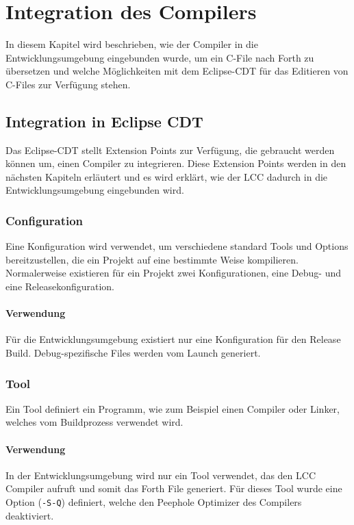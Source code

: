\chapter{Integration des Compilers}
\label{chap:compilerintegration}

In diesem Kapitel wird beschrieben, wie der Compiler in die Entwicklungsumgebung eingebunden wurde, um ein C-File nach Forth zu übersetzen und welche Möglichkeiten mit dem Eclipse-CDT für das Editieren von C-Files zur Verfügung stehen.

\section{Integration in Eclipse CDT}

Das Eclipse-CDT stellt Extension Points zur Verfügung, die gebraucht werden können um, einen Compiler zu integrieren. Diese Extension Points werden in den nächsten Kapiteln erläutert und es wird erklärt, wie der LCC dadurch in die Entwicklungsumgebung eingebunden wird.

\subsection{Configuration}
Eine Konfiguration wird verwendet, um verschiedene standard Tools und Options bereitzustellen, die ein Projekt auf eine bestimmte Weise kompilieren. Normalerweise existieren für ein Projekt zwei Konfigurationen, eine Debug- und eine Releasekonfiguration.\cite{managedbuildcdt}

\subsubsection{Verwendung}
Für die Entwicklungsumgebung existiert nur eine Konfiguration für den Release Build. Debug-spezifische Files werden vom Launch generiert.

\subsection{Tool}
Ein Tool definiert ein Programm, wie zum Beispiel einen Compiler oder Linker, welches vom Buildprozess verwendet wird.\cite{managedbuildcdt}

\subsubsection{Verwendung}
In der Entwicklungsumgebung wird nur ein Tool verwendet, das den LCC Compiler aufruft und somit das Forth File generiert. Für dieses Tool wurde eine Option (\verb!-S-Q!) definiert, welche den Peephole Optimizer des Compilers deaktiviert.

